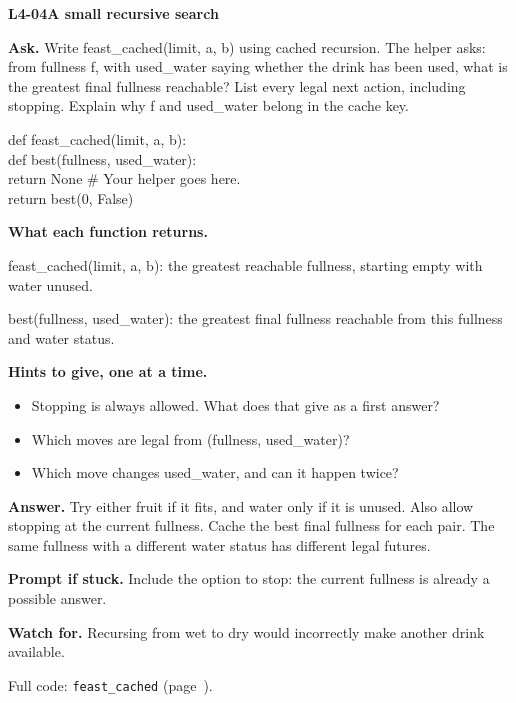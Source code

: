 \documentclass[11pt,a4paper]{article}
\begin{document}
\noindent\begin{minipage}{\textwidth}
{\color{teal}\textbf{L4-04}}\quad \textbf{A small recursive search}\par\smallskip
\textbf{Ask.} Write feast\_cached(limit, a, b) using cached recursion. The helper asks: from fullness f, with used\_water saying whether the drink has been used, what is the greatest final fullness reachable? List every legal next action, including stopping. Explain why f and used\_water belong in the cache key.\par\smallskip
\par{}\par\smallskip\noindent\colorbox{codepaper}{\parbox{\dimexpr\linewidth-2\fboxsep\relax}{\small\ttfamily\raggedright def feast\_cached(limit, a, b):\\\hspace*{2.4em}def best(fullness, used\_water):\\\hspace*{4.8em}return None  \# Your helper goes here.\\\hspace*{2.4em}return best(0, False)}}\par
{\small\textbf{What each function returns.}\par feast\_cached(limit, a, b): the greatest reachable fullness, starting empty with water unused.\par best(fullness, used\_water): the greatest final fullness reachable from this fullness and water status.\par }
{\small\textbf{Hints to give, one at a time.}}\begin{itemize}\item Stopping is always allowed. What does that give as a first answer?\item Which moves are legal from (fullness, used\_water)?\item Which move changes used\_water, and can it happen twice?\end{itemize}
\textbf{Answer.} Try either fruit if it fits, and water only if it is unused. Also allow stopping at the current fullness. Cache the best final fullness for each pair. The same fullness with a different water status has different legal futures.\par\smallskip
\textbf{Prompt if stuck.} Include the option to stop: the current fullness is already a possible answer.\par\smallskip
\textbf{Watch for.} Recursing from wet to dry would incorrectly make another drink available.\par\smallskip Full code: \texttt{feast\_cached} (page~\pageref{L4-code-feast_cached}).
\end{minipage}\par{}\medskip
\end{document}
